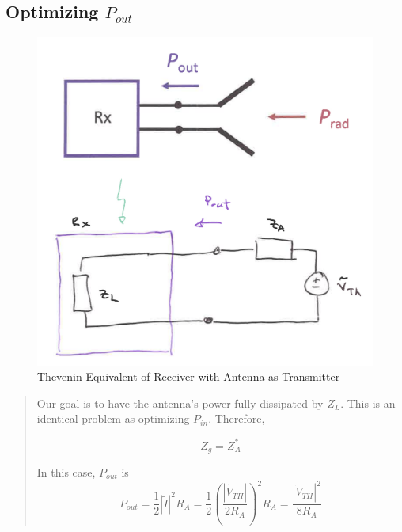 \documentclass{article} %
\begin{document}
\subsection{Optimizing $P_{out}$}

\begin{figure}[H]
    \centering
    \includegraphics[width=1\textwidth]{./image/figure6.png}
    \caption{Thevenin Equivalent of Receiver with Antenna as Transmitter}
\end{figure}

\begin{quote}
    Our goal is to have the antenna's power fully dissipated by $Z_L$.
    This is an identical problem as optimizing $P_{in}$. Therefore,

    \[Z_g = Z_A^*\]

    In this case, $P_{out}$ is
    \[P_{out} = \frac{1}{2}|\tilde{I}|^2 R_A = \frac{1}{2}\left(\frac{|\tilde{V}_{TH}|}{2R_A}\right)^2R_A = \frac{|\tilde{V}_{TH}|^2}{8R_A}\]
\end{quote}
\end{document}
